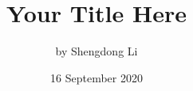 \documentclass[12pt]{article}
\begin{document}
\title{Your Title Here}
\author{by Shengdong Li}
\date{16 September 2020}
\maketitle

\end{document}
